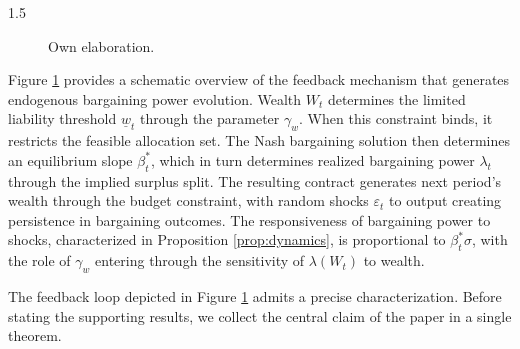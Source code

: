 \documentclass[12pt]{article}
\theoremstyle{definition}
\theoremstyle{plain}
\begin{document}
\begin{spacing}{1.5}
\begin{figure}[htbp]
\caption*{ Own elaboration.}
\label{fig:mechanism}
\end{figure}

Figure \ref{fig:mechanism} provides a schematic overview of the feedback mechanism that generates endogenous bargaining power evolution. Wealth $W_t$ determines the limited liability threshold $\underline{w}_t$ through the parameter $\gamma_w$. When this constraint binds, it restricts the feasible allocation set. The Nash bargaining solution then determines an equilibrium slope $\beta_t^*$, which in turn determines realized bargaining power $\lambda_t$ through the implied surplus split. The resulting contract generates next period's wealth through the budget constraint, with random shocks $\varepsilon_t$ to output creating persistence in bargaining outcomes. The responsiveness of bargaining power to shocks, characterized in Proposition \ref{prop:dynamics}, is proportional to $\beta_t^*\sigma$, with the role of $\gamma_w$ entering through the sensitivity of $\lambda(W_t)$ to wealth.

The feedback loop depicted in Figure \ref{fig:mechanism} admits a precise characterization. Before stating the supporting results, we collect the central claim of the paper in a single theorem.


\end{spacing}
\end{document}
